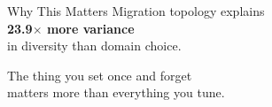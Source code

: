\documentclass[aspectratio=169,14pt]{beamer}
\begin{document}
\begin{frame}{Why This Matters}
  \vspace{10pt}
  {\large Migration topology explains}\\[10pt]
  {\LARGE\bfseries\color{geccoHighlight} 23.9$\times$ more variance}\\[10pt]
  {\large in diversity than domain choice.}
  \vspace{20pt}

  {\color{gray}
    The thing you set once and forget\\
    matters more than everything you tune.}
\end{frame}
\end{document}
